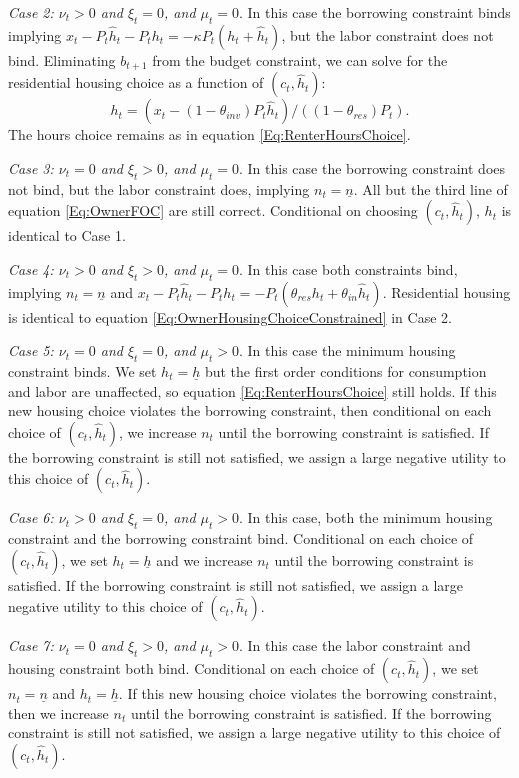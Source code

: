 \documentclass[letterpaper,12pt,dvipsnames,usenames]{article}
\theoremstyle{definition}
\begin{document}
\begin{spacing}{1.0}
\begin{small}
\emph{Case 2: $\nu_{t}>0$ and $\xi_{t}=0$, and $\mu_{t}=0$}. In this case the borrowing constraint binds implying $x_{t}-P_{t}\widehat{h}_{t}-P_{t}h_{t}=-\kappa P_{t}(h_{t}+\widehat{h}_{t})$, but the labor constraint does not bind. Eliminating $b_{t+1}$ from the budget constraint, we can solve for the residential housing choice as a function of $(c_{t},\widehat{h}_{t})$:
\begin{equation}\label{Eq:OwnerHousingChoiceConstrained}
h_{t}=(x_{t}-(1-\theta_{inv})P_{t}\widehat{h}_{t})/((1-\theta_{res})P_{t}).
\end{equation}
The hours choice remains as in equation \eqref{Eq:RenterHoursChoice}.

\emph{Case 3: $\nu_{t}=0$ and $\xi_{t}>0$, and $\mu_{t}=0$}. In this case the borrowing constraint does not bind, but the labor constraint does, implying $n_{t}=\underline{n}$. All but the third line of equation \eqref{Eq:OwnerFOC} are still correct. Conditional on choosing $(c_{t},\widehat{h}_{t})$, $h_{t}$ is identical to Case 1.

\emph{Case 4: $\nu_{t}>0$ and $\xi_{t}>0$, and $\mu_{t}=0$}. In this case both constraints bind, implying $n_{t}=\underline{n}$ and $x_{t}-P_{t}\widehat{h}_{t}-P_{t}h_{t}=-P_{t}(\theta_{res}h_{t}+\theta_{in}\widehat{h}_{t})$. Residential housing is identical to equation \eqref{Eq:OwnerHousingChoiceConstrained} in Case 2.

\emph{Case 5: $\nu_{t}=0$ and $\xi_{t}=0$, and $\mu_{t}>0$}. In this case the minimum housing constraint binds. We set $h_{t}=\underline{h}$ but the first order conditions for consumption and labor are unaffected, so equation \ref{Eq:RenterHoursChoice} still holds. If this new housing choice violates the borrowing constraint, then conditional on each choice of $(c_{t},\widehat{h}_{t})$, we increase $n_{t}$ until the borrowing constraint is satisfied. If the borrowing constraint is still not satisfied, we assign a large negative utility to this choice of $(c_{t},\widehat{h}_{t})$.

\emph{Case 6: $\nu_{t}>0$ and $\xi_{t}=0$, and $\mu_{t}>0$}. In this case, both the minimum housing constraint and the borrowing constraint bind. Conditional on each choice of $(c_{t},\widehat{h}_{t})$, we set $h_{t}=\underline{h}$ and we increase $n_{t}$ until the borrowing constraint is satisfied. If the borrowing constraint is still not satisfied, we assign a large negative utility to this choice of $(c_{t},\widehat{h}_{t})$.

\emph{Case 7: $\nu_{t}=0$ and $\xi_{t}>0$, and $\mu_{t}>0$}. In this case the labor constraint and housing constraint both bind. Conditional on each choice of $(c_{t},\widehat{h}_{t})$, we set $n_{t}=\underline{n}$ and $h_{t}=\underline{h}$. If this new housing choice violates the borrowing constraint, then we increase $n_{t}$ until the borrowing constraint is satisfied. If the borrowing constraint is still not satisfied, we assign a large negative utility to this choice of $(c_{t},\widehat{h}_{t})$.


\end{small}
\end{spacing}
\end{document}
